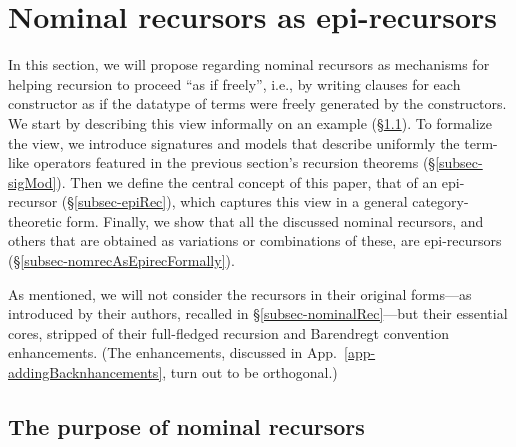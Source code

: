 \section{Nominal recursors as epi-recursors}
\label{sec-nomRecAsEpiRec}

In this section, we will propose %
regarding nominal recursors as mechanisms for helping recursion to proceed ``as if freely'', i.e.,  
by writing clauses for each constructor as if the datatype of terms were freely generated by the constructors.
We start by describing this %
view informally %
on an example  (\S\ref{subsec-purposeNomRec}).  
 To formalize the view, we introduce signatures and models 
 that describe uniformly the term-like operators featured in the previous section's recursion theorems (\S\ref{subsec-sigMod}). Then we define the central concept of this paper, that of an epi-recursor (\S\ref{subsec-epiRec}), which captures this view in a general category-theoretic form. Finally, we show that
 all the discussed nominal recursors, and others that are obtained as variations or combinations of these, %
 are epi-recursors 
  (\S\ref{subsec-nomrecAsEpirecFormally}).    
 
As mentioned, we will not consider the recursors in their original forms---as introduced by their authors, recalled in \S\ref{subsec-nominalRec}---but their essential cores, stripped of their full-fledged recursion and Barendregt convention enhancements.  
(The enhancements, discussed in 
App.~\ref{app-addingBacknhancements}, 
turn out to be orthogonal.)   
 

\vspace*{-0.5ex}\subsection{%
The purpose of nominal recursors
}
\label{subsec-purposeNomRec}

